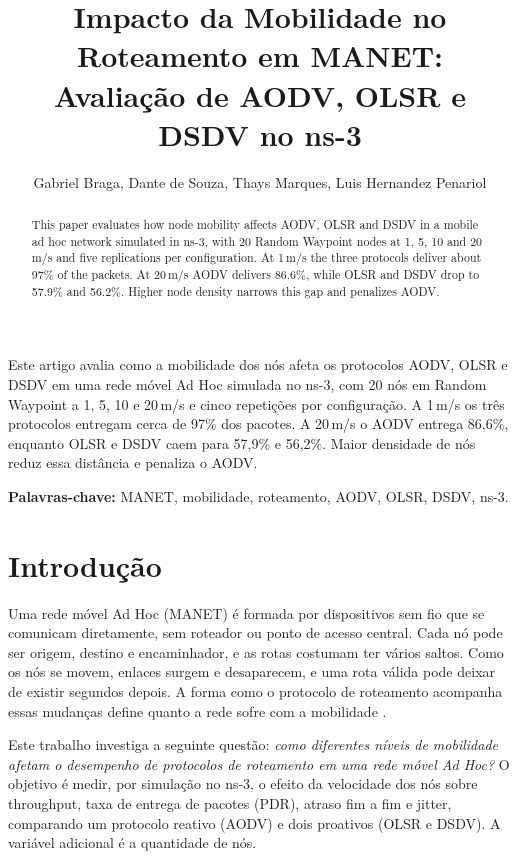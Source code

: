 \documentclass[12pt]{article}
\title{Impacto da Mobilidade no Roteamento em MANET:\\ Avaliação de AODV, OLSR e DSDV no ns-3}
\author{Gabriel Braga\inst{1}, Dante de Souza\inst{1}, Thays Marques\inst{1},
  Luis Hernandez Penariol\inst{1}}
\begin{document}
\maketitle

\begin{abstract}
  This paper evaluates how node mobility affects AODV, OLSR and DSDV in a mobile ad hoc
  network simulated in ns-3, with 20 Random Waypoint nodes at 1, 5, 10 and 20\,m/s and
  five replications per configuration. At 1\,m/s the three protocols deliver about 97\%
  of the packets. At 20\,m/s AODV delivers 86.6\%, while OLSR and DSDV drop to 57.9\% and
  56.2\%. Higher node density narrows this gap and penalizes AODV.
\end{abstract}

\begin{resumo}
  Este artigo avalia como a mobilidade dos nós afeta os protocolos AODV, OLSR e DSDV em
  uma rede móvel Ad Hoc simulada no ns-3, com 20 nós em Random Waypoint a 1, 5, 10 e
  20\,m/s e cinco repetições por configuração. A 1\,m/s os três protocolos entregam cerca
  de 97\% dos pacotes. A 20\,m/s o AODV entrega 86,6\%, enquanto OLSR e DSDV caem para
  57,9\% e 56,2\%. Maior densidade de nós reduz essa distância e penaliza o AODV.

  \noindent\textbf{Palavras-chave:} MANET, mobilidade, roteamento, AODV, OLSR, DSDV, ns-3.
\end{resumo}

\section{Introdução}

Uma rede móvel Ad Hoc (MANET) é formada por dispositivos sem fio que se comunicam
diretamente, sem roteador ou ponto de acesso central. Cada nó pode ser origem, destino e
encaminhador, e as rotas costumam ter vários saltos. Como os nós se movem, enlaces surgem
e desaparecem, e uma rota válida pode deixar de existir segundos depois. A forma como o
protocolo de roteamento acompanha essas mudanças define quanto a rede sofre com a
mobilidade \cite{broch1998}.

Este trabalho investiga a seguinte questão: \emph{como diferentes níveis de mobilidade
afetam o desempenho de protocolos de roteamento em uma rede móvel Ad Hoc?} O objetivo é
medir, por simulação no ns-3, o efeito da velocidade dos nós sobre throughput, taxa de
entrega de pacotes (PDR), atraso fim a fim e jitter, comparando um protocolo reativo
(AODV) e dois proativos (OLSR e DSDV). A variável adicional é a quantidade de nós.
\end{document}
